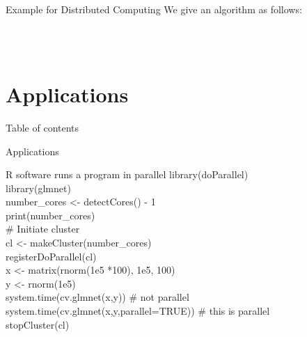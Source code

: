 \documentclass[10pt,aspectratio=169]{beamer}
\begin{document}
\begin{sloppypar}
\begin{frame}{Example for Distributed Computing}
We give an algorithm as follows:
\begin{algorithm}[H] 
	\caption{\small{:} \textcolor{red}{Distributed Communication algorithm}}
	\begin{algorithmic}
		 \\	
		\setlength{} \\
		\setlength{}
	\end{algorithmic}
\end{algorithm}
\end{frame}





\section{Applications}
\begin{frame}{Table of contents}
\end{frame}

\begin{frame}{Applications}
\begin{block}{R software runs a program in parallel}
	library(doParallel)  \\
	library(glmnet)  \\
	number\_cores <- detectCores() - 1  \\
	print(number\_cores)  \\
	\# Initiate cluster   \\
	cl <- makeCluster(number\_cores)  \\
	registerDoParallel(cl)   \\
	x <- matrix(rnorm(1e5 *100), 1e5, 100)  \\
	y <- rnorm(1e5)   \\ 
	system.time(cv.glmnet(x,y))                \# not parallel  \\
	system.time(cv.glmnet(x,y,parallel=TRUE))  \# this is parallel  \\
	stopCluster(cl)  
\end{block}
\end{frame}


\end{sloppypar}
\end{document}
